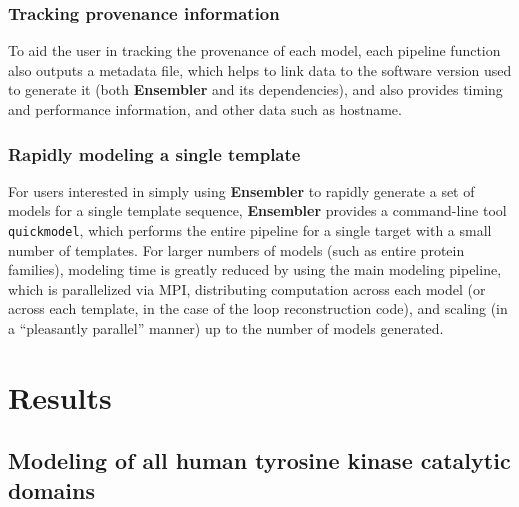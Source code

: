 \documentclass[aps,prl,preprint,nofootinbib,superscriptaddress,linenumbers]{revtex4-1}
\begin{document}
\subsubsection*{Tracking provenance information}

To aid the user in tracking the provenance of each model, each pipeline function also outputs a metadata file, which helps to link data to the software version used to generate it (both {\bf Ensembler} and its dependencies), and also provides timing and performance information, and other data such as hostname.

\subsubsection*{Rapidly modeling a single template}

For users interested in simply using {\bf Ensembler} to rapidly generate a set of models for a single template sequence, {\bf Ensembler} provides a command-line tool {\tt quickmodel}, which performs the entire pipeline for a single target with a small number of templates.
For larger numbers of models (such as entire protein families), modeling time is greatly reduced by using the main modeling pipeline, which is parallelized via MPI, distributing computation across each model (or across each template, in the case of the loop reconstruction code), and scaling (in a ``pleasantly parallel'' manner) up to the number of models generated.


\label{section:design}

\section{Results}
\label{section:results}

\subsection*{Modeling of all human tyrosine kinase catalytic domains}
\end{document}

